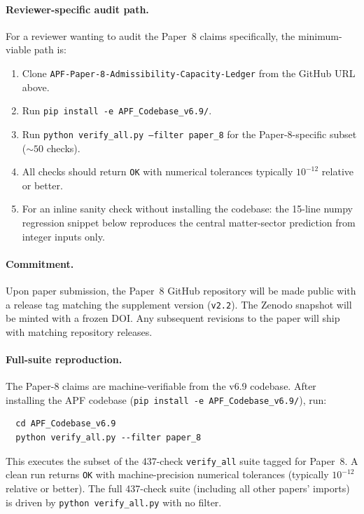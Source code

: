 \documentclass[11pt]{article}
\theoremstyle{plain}
\theoremstyle{definition}
\theoremstyle{remark}
\begin{document}
\paragraph{Reviewer-specific audit path.}  For a reviewer wanting to audit the Paper~8 claims specifically, the minimum-viable path is:
\begin{enumerate}[leftmargin=2.5em,itemsep=2pt]
  \item Clone \texttt{APF-Paper-8-Admissibility-Capacity-Ledger} from the GitHub URL above.
  \item Run \texttt{pip install -e APF\_Codebase\_v6.9/}.
  \item Run \texttt{python verify\_all.py --filter paper\_8} for the Paper-8-specific subset ($\sim 50$ checks).
  \item All checks should return \texttt{OK} with numerical tolerances typically $10^{-12}$ relative or better.
  \item For an inline sanity check without installing the codebase: the 15-line numpy regression snippet below reproduces the central matter-sector prediction from integer inputs only.
\end{enumerate}

\paragraph{Commitment.}  Upon paper submission, the Paper~8 GitHub repository will be made public with a release tag matching the supplement version (\texttt{v2.2}).  The Zenodo snapshot will be minted with a frozen DOI.  Any subsequent revisions to the paper will ship with matching repository releases.

\paragraph{Full-suite reproduction.}  The Paper-8 claims are machine-verifiable from the v6.9 codebase.  After installing the APF codebase (\texttt{pip install -e APF\_Codebase\_v6.9/}), run:
\begin{verbatim}
  cd APF_Codebase_v6.9
  python verify_all.py --filter paper_8
\end{verbatim}
This executes the subset of the 437-check \texttt{verify\_all} suite tagged for Paper~8.  A clean run returns \texttt{OK} with machine-precision numerical tolerances (typically $10^{-12}$ relative or better).  The full 437-check suite (including all other papers' imports) is driven by \texttt{python verify\_all.py} with no filter.
\end{document}

